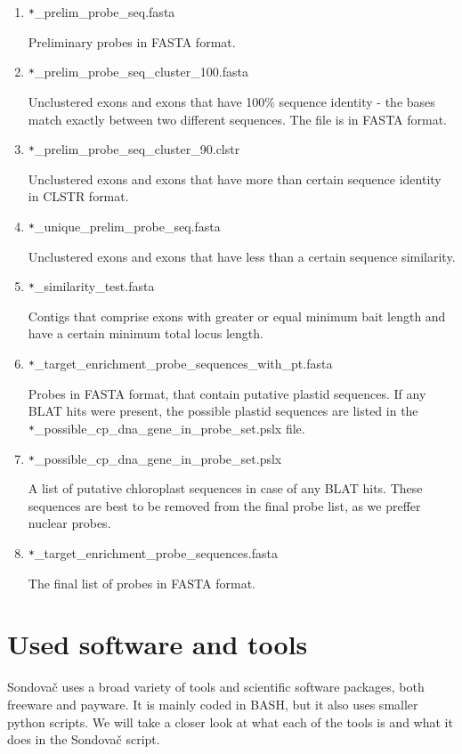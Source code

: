 \begin{enumerate}
\item \verb_*_\_prelim\_probe\_seq.fasta

Preliminary probes in FASTA format. 

\item \verb_*_\_prelim\_probe\_seq\_cluster\_100.fasta

Unclustered exons and exons that have 100\% sequence identity - the bases match exactly between two different sequences. The file is in 
FASTA format. 

\item \verb_*_\_prelim\_probe\_seq\_cluster\_90.clstr

Unclustered exons and exons that have more than certain sequence identity in CLSTR format. 

\item \verb_*_\_unique\_prelim\_probe\_seq.fasta

Unclustered exons and exons that have less than a certain sequence similarity. 

\item \verb_*_\_similarity\_test.fasta

Contigs that comprise exons with greater or equal minimum bait length and have a certain minimum total locus length. 

\item \verb_*_\_target\_enrichment\_probe\_sequences\_with\_pt.fasta

Probes in FASTA format, that contain putative plastid sequences. If any BLAT hits were present, the possible plastid sequences are listed in the 
\verb_*_\_possible\_cp\_dna\_gene\_in\_probe\_set.pslx file. 

\item \verb_*_\_possible\_cp\_dna\_gene\_in\_probe\_set.pslx

A list of putative chloroplast sequences in case of any BLAT hits. These sequences are best to be removed from the final probe list, as we preffer nuclear probes. 

\item \verb_*_\_target\_enrichment\_probe\_sequences.fasta

The final list of probes in FASTA format. 

\end{enumerate}


\section{Used software and tools}
Sondovač uses a broad variety of tools and scientific software packages, both freeware and payware. It is mainly coded in BASH, but it also uses smaller python 
scripts. We will take a closer look at what each of the tools is and what it does in the Sondovač script. 

